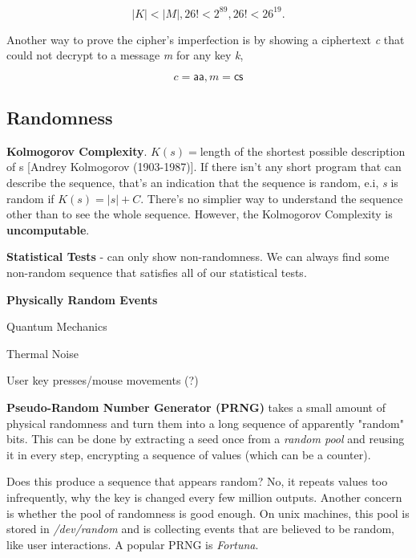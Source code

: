 \documentclass[12pt]{article}
\begin{document}
\begin{equation}
|K| < |M|, 26! < 2^{89}, 26! < 26^{19}.
\end{equation}

Another way to prove the cipher's imperfection is by showing a ciphertext \emph{c} that could not decrypt to a message \emph{m} for any key \emph{k},

\begin{equation}
c = \mathsf{aa}, m = \mathsf{cs}
\end{equation}

\subsection*{Randomness}
\textbf{Kolmogorov Complexity}.
$K(s) = $length of the shortest possible description of s [Andrey Kolmogorov (1903-1987)]. If there isn't any short program that can describe the sequence, that's an indication that the sequence is random, e.i, \emph{s} is random if $K(s) = |s| + C$. There's no simplier way to understand the sequence other than to see the whole sequence. However, the Kolmogorov Complexity is \textbf{uncomputable}.

\textbf{Statistical Tests} - can only show non-randomness. We can always find some non-random sequence that satisfies all of our statistical tests.

\textbf{Physically Random Events}\begin{list}{*}{
\setlength{\itemsep}{0pt}
\setlength{\parsep}{0pt}
\setlength{\topsep}{0pt}
\setlength{\partopsep}{0pt}
\setlength{\leftmargin}{2em}
\setlength{\labelwidth}{1.5em}
\setlength{\labelsep}{0.5em}
}
\item Quantum Mechanics
\item Thermal Noise
\item User key presses/mouse movements (?)
\end{list}

\textbf{Pseudo-Random Number Generator (PRNG)} takes a small amount of physical randomness and turn them into a long sequence of apparently "random" bits. This can be done by extracting a seed once from a \emph{random pool} and reusing it in every step, encrypting a sequence of values (which can be a counter).

Does this produce a sequence that appears random? No, it repeats values too infrequently, why the key is changed every few million outputs. Another concern is whether the pool of randomness is good enough. On unix machines, this pool is stored in \emph{/dev/random} and is collecting events that are believed to be random, like user interactions. A popular PRNG is \emph{Fortuna}.
\end{document}
